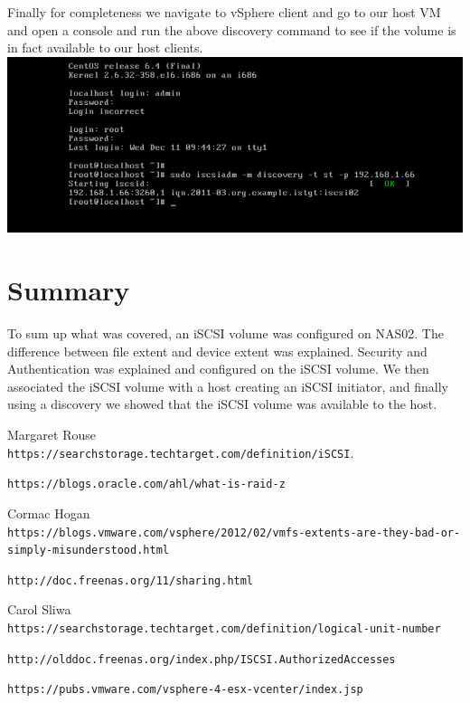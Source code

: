 Finally for completeness we navigate to vSphere client and go to our host VM and open a console and run the above discovery command to see if the volume is in fact available to our host clients.
\\\includegraphics[width=\textwidth]{17.png}

\section{Summary}
To sum up what was covered, an iSCSI volume was configured on NAS02. The difference between file extent and device extent was explained. Security and Authentication was explained and configured on the iSCSI volume. We then associated the iSCSI volume with a host creating an iSCSI initiator, and finally using a discovery we showed that the iSCSI volume was available to the host.

\begin{thebibliography}{9}
Margaret Rouse
\\\texttt{https://searchstorage.techtarget.com/definition/iSCSI}. 

\texttt{https://blogs.oracle.com/ahl/what-is-raid-z}

Cormac Hogan
\\\texttt{https://blogs.vmware.com/vsphere/2012/02/vmfs-extents-are-they-bad-or-simply-misunderstood.html}

\texttt{http://doc.freenas.org/11/sharing.html}

Carol Sliwa
\\\texttt{https://searchstorage.techtarget.com/definition/logical-unit-number}

\texttt{http://olddoc.freenas.org/index.php/ISCSI.AuthorizedAccesses}

\texttt{https://pubs.vmware.com/vsphere-4-esx-vcenter/index.jsp}

\end{thebibliography}


